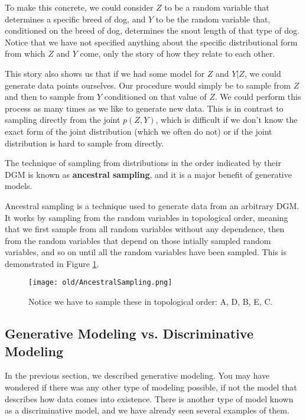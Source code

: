 To make this concrete, we could consider $Z$ to be a random variable that determines a specific breed of dog, and $Y$ to be the random variable that, conditioned on the breed of dog, determines the snout length of that type of dog. Notice that we have not specified anything about the specific distributional form from which $Z$ and $Y$ come, only the story of how they relate to each other.

This story also shows us that if we had some model for $Z$ and $Y|Z$, we could generate data points ourselves. Our procedure would simply be to sample from $Z$ and then to sample from $Y$ conditioned on that value of $Z$. We could perform this process as many times as we like to generate new data. This is in contrast to sampling directly from the joint $p(Z, Y)$, which is difficult if we don't know the exact form of the joint distribution (which we often do not) or if the joint distribution is hard to sample from directly.

The technique of sampling from distributions in the order indicated by their DGM is known as \textbf{ancestral sampling}, and it is a major benefit of generative models.

\begin{definition}
	Ancestral sampling is a technique used to generate data from an arbitrary DGM. It works by sampling from the random variables in topological order, meaning that we first sample from all random variables without any dependence, then from the random variables that depend on those intially sampled random variables, and so on until all the random variables have been sampled. This is demonstrated in Figure \ref{fig:ancestral-sampling}.
\end{definition}
\begin{figure}
	\centering
	\texttt{[image: old/AncestralSampling.png]}
    \caption{Notice we have to sample these in topological order: A, D, B, E, C.}
	\label{fig:ancestral-sampling}
\end{figure}

\subsection{Generative Modeling vs. Discriminative Modeling}
In the previous section, we described generative modeling. You may have wondered if there was any other type of modeling possible, if not the model that describes how data comes into existence. There is another type of model known as a discriminative model, and we have already seen several examples of them.

